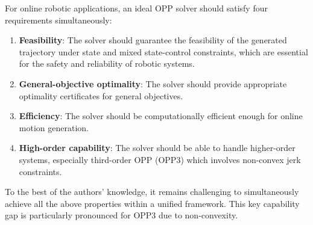 \documentclass[journal]{IEEEtran}
\theoremstyle{definition}
\theoremstyle{definition}
\begin{document}
For online robotic applications, an ideal OPP solver should satisfy four requirements simultaneously:
\begin{enumerate}
    \item \textbf{Feasibility}: The solver should guarantee the feasibility of the generated trajectory under state and mixed state-control constraints, which are essential for the safety and reliability of robotic systems.
    \item \textbf{General-objective optimality}: The solver should provide appropriate optimality certificates for general objectives.
    \item \textbf{Efficiency}: The solver should be computationally efficient enough for online motion generation.
    \item \textbf{High-order capability}: The solver should be able to handle higher-order systems, especially third-order OPP (OPP3) which involves non-convex jerk constraints.
\end{enumerate}
To the best of the authors' knowledge, it remains challenging to simultaneously achieve all the above properties within a unified framework. This key capability gap is particularly pronounced for OPP3 due to non-convexity.
\end{document}
